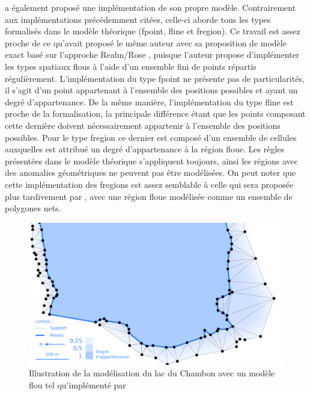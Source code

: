 \textcite{Schneider2003} a également proposé une implémentation de son
propre modèle. Contrairement aux implémentations précédemment citées,
celle-ci aborde tous les types formalisés dans le modèle théorique
(fpoint, fline et fregion). Ce travail est assez proche de ce qu’avait
proposé le même auteur avec sa proposition de modèle exact basé sur
l’approche Realm/Rose \textcite{Schneider1996}, puisque l’auteur
propose d’implémenter les types spatiaux flous à l’aide d’un ensemble
fini de points répartis régulièrement. L’implémentation du type fpoint
ne présente pas de particularités, il s’agit d’un point appartenant à
l’ensemble des positions possibles et ayant un degré
d’appartenance. De la même manière, l’implémentation du type fline est
proche de la formalisation, la principale différence étant que les
points composant cette dernière doivent nécessairement appartenir à
l’ensemble des positions possibles. Pour le type fregion ce dernier
est composé d’un ensemble de cellules auxquelles est attribué un degré
d’appartenance à la région floue. Les règles présentées dans le modèle
théorique s’appliquent toujours, ainsi les régions avec des anomalies
géométriques ne peuvent pas être modélisées. On peut noter que cette
implémentation des fregions est assez semblable à celle qui sera
proposée plus tardivement par \textcite{Kanjinal2010}, avec une région
floue modélisée comme un ensemble de polygones nets.

\begin{figure}
  \centering
  \includegraphics{../figures/fig10.png}
  \caption{Illustration de la modélisation du lac du Chambon avec un
    modèle flou tel qu’implémenté par \textcite{Dilo2007}}
  \label{fig:champ_dilo}
\end{figure}


